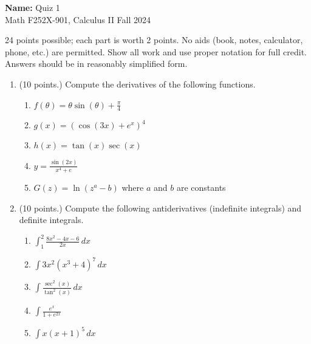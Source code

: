 \documentclass[12pt]{article}
\newcommand{\ds}{\displaystyle}
\newcommand{\points}[1]{(#1 points.)}		%
\begin{document}
\pagestyle{plain}

\noindent \textbf{Name:} \underline{\hspace{15em}}		\hfill	Quiz 1 \\
           Math F252X-901, Calculus II  			\hfill	Fall 2024 	

                \vspace{1cm}
                
24 points possible; each part is worth 2 points. No aids (book, notes,
calculator, phone, etc.) are permitted. Show all work and use proper
notation for full credit. Answers should be in reasonably simplified
form.

\begin{enumerate}
\item \points{10} Compute the derivatives of the following functions.
  \begin{enumerate}
  \item $\ds f(\theta) = \theta \sin(\theta) + \frac{\pi}{4}$
    \vfill
  \item $\ds g(x) = (\cos(3x)+e^x)^4$
    \vfill

  \item $\ds h(x) = \tan(x)\sec(x)$
    \vfill

    \newpage

  \item $\ds y = \frac{\sin(2x)}{x^4+e}$
    \vfill

  \item $\ds G(z) = \ln(z^a - b)$ where $a$ and $b$ are constants
    \vfill

  \end{enumerate}
  
  \newpage

\item \points{10} Compute the following antiderivatives (indefinite integrals) and definite integrals.
  \begin{enumerate}
  \item $\ds \int_1^2 \frac{8x^2-4x-6}{2x} \, dx$
    \vfill

  \item $\ds \int 3x^2(x^3 + 4)^7 \, dx$

    \vfill

  \item $\ds \int \frac{\sec^2(x)}{\tan^2(x)} \, dx$
    \vfill

    \newpage

  \item $\ds \int \frac{e^{x}}{1+e^{2x}}$
    \vfill

  \item $\ds \int x(x+1)^5 \, dx$
    \vfill

  \end{enumerate}
  
    
    
\end{enumerate}
\end{document}
